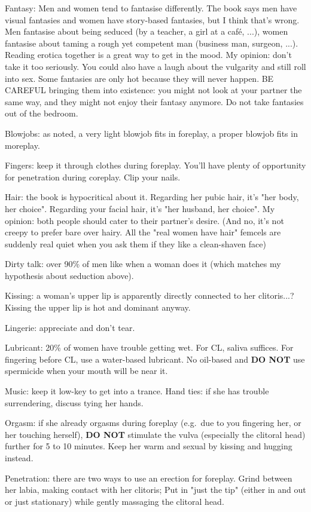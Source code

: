 \begin{outline}
\1 Fantasy:
	\2 Men and women tend to fantasise differently. The book says men have visual fantasies and women have story-based fantasies, but I think that's wrong. Men fantasise about being seduced (by a teacher, a girl at a café, ...), women fantasise about taming a rough yet competent man (business man, surgeon, ...).
	\2 Reading erotica together is a great way to get in the mood. My opinion: don't take it too seriously. You could also have a laugh about the vulgarity and still roll into sex.
	\2 Some fantasies are only hot because they will never happen. BE CAREFUL bringing them into existence: you might not look at your partner the same way, and they might not enjoy their fantasy anymore. Do not take fantasies out of the bedroom.

\1 Blowjobs: as noted, a very light blowjob fits in foreplay, a proper blowjob fits in moreplay.

\1 Fingers: keep it through clothes during foreplay. You'll have plenty of opportunity for penetration during coreplay. Clip your nails.

\1 Hair: the book is hypocritical about it. Regarding her pubic hair, it's "her body, her choice". Regarding your facial hair, it's "her husband, her choice". My opinion: both people should cater to their partner's desire. (And no, it's not creepy to prefer bare over hairy. All the "real women have hair" femcels are suddenly real quiet when you ask them if they like a clean-shaven face)

\1 Dirty talk: over 90\% of men like when a woman does it (which matches my hypothesis about seduction above).

\1 Kissing: a woman's upper lip is apparently directly connected to her clitoris...? Kissing the upper lip is hot and dominant anyway.

\1 Lingerie: appreciate and don't tear.

\1 Lubricant: 20\% of women have trouble getting wet. For CL, saliva suffices. For fingering before CL, use a water-based lubricant. No oil-based and \textbf{DO NOT} use spermicide when your mouth will be near it.

\1 Music: keep it low-key to get into a trance.
Hand ties: if she has trouble surrendering, discuss tying her hands.

\1 Orgasm: if she already orgasms during foreplay (e.g.\ due to you fingering her, or her touching herself), \textbf{DO NOT} stimulate the vulva (especially the clitoral head) further for 5 to 10 minutes. Keep her warm and sexual by kissing and hugging instead.

\1 Penetration: there are two ways to use an erection for foreplay.
	\2 Grind between her labia, making contact with her clitoris;
	\2 Put in "just the tip" (either in and out or just stationary) while gently massaging the clitoral head.
\end{outline}

